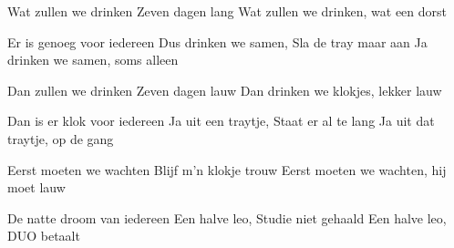 \begin{verse*}
Wat zullen we drinken
Zeven dagen lang
Wat zullen we drinken, wat een dorst
\end{verse*}

\begin{verse*}
Er is genoeg voor iedereen
Dus drinken we samen,
Sla de tray maar aan
Ja drinken we samen, soms alleen
\end{verse*}

\begin{verse*}
Dan zullen we drinken
Zeven dagen lauw
Dan drinken we klokjes, lekker lauw
\end{verse*}

\begin{verse*}
Dan is er klok voor iedereen
Ja uit een traytje,
Staat er al te lang
Ja uit dat traytje, op de gang
\end{verse*}

\begin{verse*}
Eerst moeten we wachten
Blijf m'n klokje trouw
Eerst moeten we wachten, hij moet lauw
\end{verse*}

\begin{verse*}
De natte droom van iedereen
Een halve leo,
Studie niet gehaald
Een halve leo, DUO betaalt
\end{verse*}
